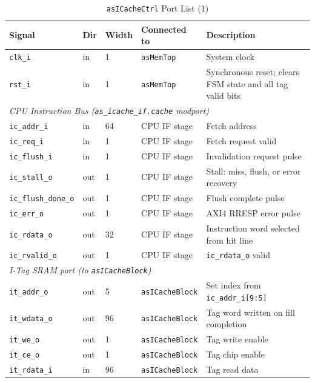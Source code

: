 \begin{table}[H]
\caption{\texttt{asICacheCtrl} Port List (1)}
\label{tab:asICacheCtrlPorts}
\centering
\begin{tabularx}{\textwidth}{|l |l |l |l |X|}
  \hline
  Signal & Dir & Width & Connected to & Description \\
  \hline
  \hline
  \texttt{clk\_i}  & in & 1 & \texttt{asMemTop} & System clock \\
  \hline
  \texttt{rst\_i}  & in & 1 & \texttt{asMemTop} & Synchronous reset; clears FSM state and all tag valid bits \\
  \hline
  \multicolumn{5}{|l|}{\textit{CPU Instruction Bus (\texttt{as\_icache\_if.cache} modport)}} \\
  \hline
  \texttt{ic\_addr\_i}        & in  & 64 & CPU IF stage & Fetch address \\
  \hline
  \texttt{ic\_req\_i}         & in  & 1  & CPU IF stage & Fetch request valid \\
  \hline
  \texttt{ic\_flush\_i}       & in  & 1  & CPU IF stage & Invalidation request pulse \\
  \hline
  \texttt{ic\_stall\_o}       & out & 1  & CPU IF stage & Stall: miss, flush, or error recovery \\
  \hline
  \texttt{ic\_flush\_done\_o} & out & 1  & CPU IF stage & Flush complete pulse \\
  \hline
  \texttt{ic\_err\_o}         & out & 1  & CPU IF stage & AXI4 RRESP error pulse \\
  \hline
  \texttt{ic\_rdata\_o}       & out & 32 & CPU IF stage & Instruction word selected from hit line \\
  \hline
  \texttt{ic\_rvalid\_o}      & out & 1  & CPU IF stage & \texttt{ic\_rdata\_o} valid \\
  \hline
  \multicolumn{5}{|l|}{\textit{I-Tag SRAM port (to \texttt{asICacheBlock})}} \\
  \hline
  \texttt{it\_addr\_o}  & out & 5  & \texttt{asICacheBlock} & Set index from \texttt{ic\_addr\_i[9:5]} \\
  \hline
  \texttt{it\_wdata\_o} & out & 96 & \texttt{asICacheBlock} & Tag word written on fill completion \\
  \hline
  \texttt{it\_we\_o}    & out & 1  & \texttt{asICacheBlock} & Tag write enable \\
  \hline
  \texttt{it\_ce\_o}    & out & 1  & \texttt{asICacheBlock} & Tag chip enable \\
  \hline
  \texttt{it\_rdata\_i} & in  & 96 & \texttt{asICacheBlock} & Tag read data \\

\end{tabularx}
\end{table}
